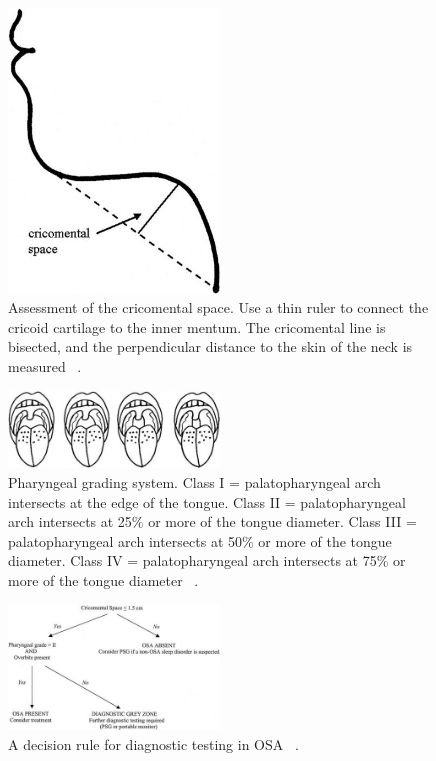 \begin{figure}[h]
\centering 
\includegraphics[width=0.5\textwidth]{drawings/cricomental}
\caption{Assessment of the cricomental space. Use a thin ruler to connect the cricoid cartilage to the inner mentum. The cricomental line is bisected, and the perpendicular distance to the skin of the neck is measured ~\cite{tsai2003decision}.}
\label{fig: cricomental}
\end{figure}
\begin{figure}[h]
\centering 
\includegraphics[width=0.5\textwidth]{drawings/pharyngeal}
\caption{Pharyngeal grading system. Class I = palatopharyngeal arch intersects at the edge of the tongue. Class II = palatopharyngeal arch intersects at 25\% or more of the tongue diameter. Class III = palatopharyngeal arch intersects at 50\% or more of the tongue diameter. Class IV = palatopharyngeal arch intersects at 75\% or more of the tongue diameter ~\cite{tsai2003decision}.}
\label{fig: pharyngeal}
\end{figure}
\begin{figure}[h]
\centering 
\includegraphics[width=0.5\textwidth]{drawings/flowchart}
\caption{A decision rule for diagnostic testing in OSA ~\cite{tsai2003decision}.}
\label{fig: flowchart}
\end{figure}

